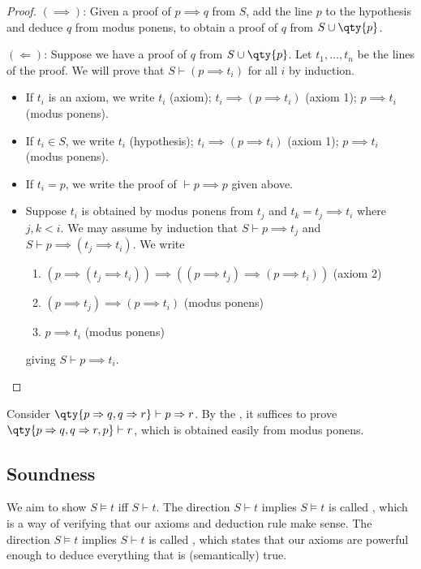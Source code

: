 \begin{proof}
    $(\implies)$: Given a proof of $p \implies q$ from $S$, add the line $p$ to the hypothesis and deduce $q$ from modus ponens, to obtain a proof of $q$ from $S \cup \qty{p}$.

    $(\Leftarrow)$: Suppose we have a proof of $q$ from $S \cup \qty{p}$.
    Let $t_1, \dots, t_n$ be the lines of the proof.
    We will prove that $S \vdash (p \implies t_i)$ for all $i$ by induction.
    \begin{itemize}
        \item If $t_i$ is an axiom, we write $t_i$ (axiom); $t_i \implies (p \implies t_i)$ (axiom 1); $p \implies t_i$ (modus ponens).
        \item If $t_i \in S$, we write $t_i$ (hypothesis); $t_i \implies (p \implies t_i)$ (axiom 1); $p \implies t_i$ (modus ponens).
        \item If $t_i = p$, we write the proof of $\vdash p \implies p$ given above.
        \item Suppose $t_i$ is obtained by modus ponens from $t_j$ and $t_k = t_j \implies t_i$ where $j, k < i$.
        We may assume by induction that $S \vdash p \implies t_j$ and $S \vdash p \implies (t_j \implies t_i)$.
        We write
        \begin{enumerate}
            \item $(p \implies (t_j \implies t_i)) \implies ((p \implies t_j) \implies (p \implies t_i))$ (axiom 2)
            \item $(p \implies t_j) \implies (p \implies t_i)$ (modus ponens)
            \item $p \implies t_i$ (modus ponens)
        \end{enumerate}
        giving $S \vdash p \implies t_i$.
    \end{itemize}
\end{proof}

\begin{example}
    Consider $\qty{p \implies q, q \implies r} \vdash p \implies r$.
    By the , it suffices to prove $\qty{p \implies q, q \implies r, p} \vdash r$, which is obtained easily from modus ponens.
\end{example}

\subsection{Soundness}
We aim to show $S \models t$ iff $S \vdash t$.
The direction $S \vdash t$ implies $S \models t$ is called , which is a way of verifying that our axioms and deduction rule make sense.
The direction $S \models t$ implies $S \vdash t$ is called , which states that our axioms are powerful enough to deduce everything that is (semantically) true.

